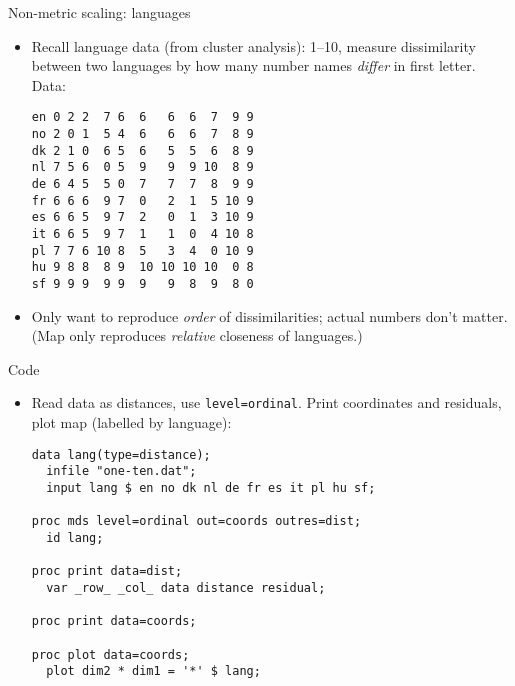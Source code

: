 \documentclass[pdf]{prosper}
\begin{document}
\begin{slide}{Non-metric scaling: languages}

  \begin{itemize}
  \item Recall language data (from cluster analysis): 1--10, measure dissimilarity between two languages by how many number names {\em differ} in first letter. Data:

\begin{verbatim}
en 0 2 2  7 6  6   6  6  7  9 9
no 2 0 1  5 4  6   6  6  7  8 9
dk 2 1 0  6 5  6   5  5  6  8 9
nl 7 5 6  0 5  9   9  9 10  8 9
de 6 4 5  5 0  7   7  7  8  9 9
fr 6 6 6  9 7  0   2  1  5 10 9
es 6 6 5  9 7  2   0  1  3 10 9
it 6 6 5  9 7  1   1  0  4 10 8
pl 7 7 6 10 8  5   3  4  0 10 9
hu 9 8 8  8 9  10 10 10 10  0 8
sf 9 9 9  9 9  9   9  8  9  8 0

\end{verbatim}

\item Only want to reproduce {\em order} of dissimilarities; actual numbers don't matter. (Map only reproduces {\em relative} closeness of languages.)

  \end{itemize}
  
\end{slide}

\begin{slide}{Code}

  \begin{itemize}
  \item Read data as distances, use \verb-level=ordinal-. Print coordinates and residuals, plot map (labelled by language):

\begin{verbatim}
data lang(type=distance);
  infile "one-ten.dat";
  input lang $ en no dk nl de fr es it pl hu sf;

proc mds level=ordinal out=coords outres=dist;
  id lang;

proc print data=dist;
  var _row_ _col_ data distance residual;

proc print data=coords;

proc plot data=coords;
  plot dim2 * dim1 = '*' $ lang;

\end{verbatim}
  \end{itemize}
  
\end{slide}
\end{document}
